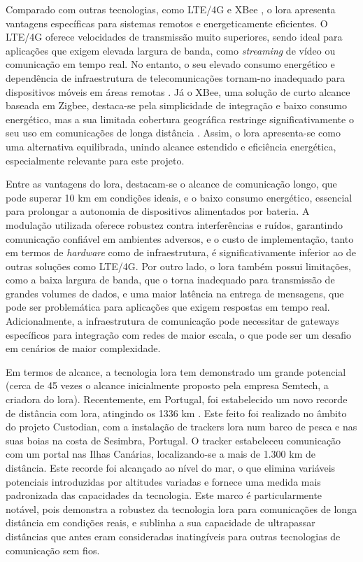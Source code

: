Comparado com outras tecnologias, como LTE/4G e XBee \cite{digi-xbee}, o \gls{lora} apresenta vantagens específicas para sistemas remotos e energeticamente eficientes. O LTE/4G oferece velocidades de transmissão muito superiores, sendo ideal para aplicações que exigem elevada largura de banda, como \textit{streaming} de vídeo ou comunicação em tempo real. No entanto, o seu elevado consumo energético e dependência de infraestrutura de telecomunicações tornam-no inadequado para dispositivos móveis em áreas remotas \cite{bivocom-lte-vs-lora}. Já o XBee, uma solução de curto alcance baseada em Zigbee, destaca-se pela simplicidade de integração e baixo consumo energético, mas a sua limitada cobertura geográfica restringe significativamente o seu uso em comunicações de longa distância \cite{digi-xbee-specs, xbee-range-comparison}. Assim, o \gls{lora} apresenta-se como uma alternativa equilibrada, unindo alcance estendido e eficiência energética, especialmente relevante para este projeto.

Entre as vantagens do \gls{lora}, destacam-se o alcance de comunicação longo, que pode superar 10 km em condições ideais, e o baixo consumo energético, essencial para prolongar a autonomia de dispositivos alimentados por bateria. A modulação utilizada oferece robustez contra interferências e ruídos, garantindo comunicação confiável em ambientes adversos, e o custo de implementação, tanto em termos de \emph{hardware} como de infraestrutura, é significativamente inferior ao de outras soluções como LTE/4G. Por outro lado, o \gls{lora} também possui limitações, como a baixa largura de banda, que o torna inadequado para transmissão de grandes volumes de dados, e uma maior latência na entrega de mensagens, que pode ser problemática para aplicações que exigem respostas em tempo real. Adicionalmente, a infraestrutura de comunicação pode necessitar de gateways específicos para integração com redes de maior escala, o que pode ser um desafio em cenários de maior complexidade.

Em termos de alcance, a tecnologia \gls{lora} tem demonstrado um grande potencial (cerca de 45 vezes o alcance inicialmente proposto pela empresa Semtech, a criadora do \gls{lora}). Recentemente, em Portugal, foi estabelecido um novo recorde de distância com \gls{lora}, atingindo os 1336 km \cite{pplware-lora}. Este feito foi realizado no âmbito do projeto Custodian, com a instalação de trackers \gls{lora} num barco de pesca e nas suas boias na costa de Sesimbra, Portugal. O tracker estabeleceu comunicação com um portal nas Ilhas Canárias, localizando-se a mais de 1.300 km de distância. Este recorde foi alcançado ao nível do mar, o que elimina variáveis potenciais introduzidas por altitudes variadas e fornece uma medida mais padronizada das capacidades da tecnologia. Este marco é particularmente notável, pois demonstra a robustez da tecnologia \gls{lora} para comunicações de longa distância em condições reais, e sublinha a sua capacidade de ultrapassar distâncias que antes eram consideradas inatingíveis para outras tecnologias de comunicação sem fios.

